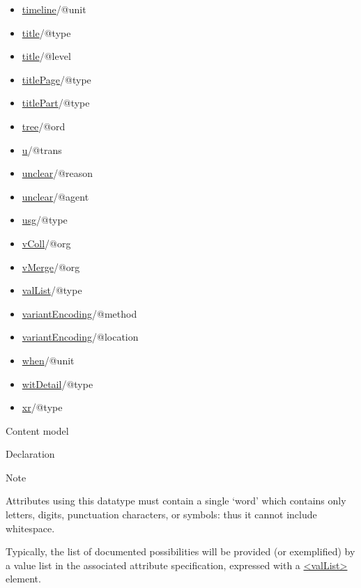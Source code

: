 \begin{reflist}
\begin{itemize}
\item \hyperref[TEI.timeline]{timeline}/@unit
\item \hyperref[TEI.title]{title}/@type
\item \hyperref[TEI.title]{title}/@level
\item \hyperref[TEI.titlePage]{titlePage}/@type
\item \hyperref[TEI.titlePart]{titlePart}/@type
\item \hyperref[TEI.tree]{tree}/@ord
\item \hyperref[TEI.u]{u}/@trans
\item \hyperref[TEI.unclear]{unclear}/@reason
\item \hyperref[TEI.unclear]{unclear}/@agent
\item \hyperref[TEI.usg]{usg}/@type
\item \hyperref[TEI.vColl]{vColl}/@org
\item \hyperref[TEI.vMerge]{vMerge}/@org
\item \hyperref[TEI.valList]{valList}/@type
\item \hyperref[TEI.variantEncoding]{variantEncoding}/@method
\item \hyperref[TEI.variantEncoding]{variantEncoding}/@location
\item \hyperref[TEI.when]{when}/@unit
\item \hyperref[TEI.witDetail]{witDetail}/@type
\item \hyperref[TEI.xr]{xr}/@type
\end{itemize} 
    \item[{Content model}]
    \item[{Declaration}]
    \item[{Note}]
  \par
Attributes using this datatype must contain a single ‘word’ which contains only letters, digits, punctuation characters, or symbols: thus it cannot include whitespace.\par
Typically, the list of documented possibilities will be provided (or exemplified) by a value list in the associated attribute specification, expressed with a \hyperref[TEI.valList]{<valList>} element.
\end{reflist}  
